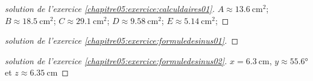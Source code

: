 \begin{proof}[solution de l'exercice \ref{chapitre05:exercice:calculdaires01}] \hfill 	
	
$A\approx\SI{13.6}{\centi\meter^2}$; $B\approx\SI{18.5}{\centi\meter^2}$; $C\approx\SI{29.1}{\centi\meter^2}$; $D\approx\SI{9.58}{\centi\meter^2}$; $E\approx\SI{5.14}{\centi\meter^2}$; 
\end{proof}

\begin{proof}[solution de l'exercice \ref{chapitre05:exercice:formuledesinus01}] \hfill 	

\end{proof}
\begin{proof}[solution de l'exercice \ref{chapitre05:exercice:formuledesinus02}] \hfill 	
	
\noindent $x=\SI{6.3}{\centi\meter} $, $y\approx \ang{55.6}$ et $z\approx \SI{6.35}{\centi\meter}$
\end{proof}